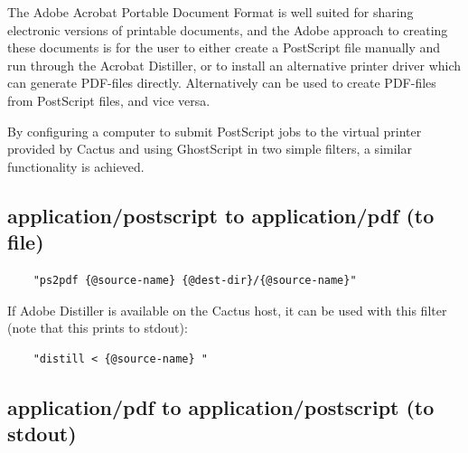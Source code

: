



The Adobe Acrobat Portable Document Format is well suited for sharing
electronic versions of printable documents, and the Adobe approach to
creating these documents is for the user to either create a PostScript
file manually and run through the Acrobat Distiller, or to install an
alternative printer driver which can generate PDF-files directly.
Alternatively  can be used to create PDF-files from PostScript files, and
vice versa.

By configuring a computer to submit PostScript jobs to the virtual
printer provided by Cactus and using GhostScript in two simple filters,
a similar functionality is achieved.

\subsection*{application/postscript to application/pdf (to file)}

\begin{verbatim}
    "ps2pdf {@source-name} {@dest-dir}/{@source-name}"
\end{verbatim}

If Adobe Distiller is available on the Cactus host, it can be used
with this filter (note that this prints to stdout):

\begin{verbatim}
    "distill < {@source-name} "
\end{verbatim}


\subsection*{application/pdf to application/postscript (to stdout)}

